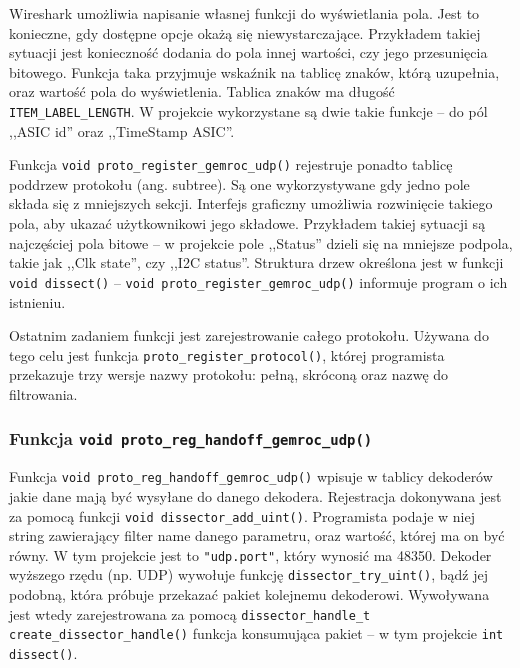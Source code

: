 \documentclass[a4paper, 12pt, twoside, openright]{article}
\begin{document}
	Wireshark umożliwia napisanie własnej funkcji do wyświetlania pola. Jest to konieczne, gdy dostępne opcje okażą się niewystarczające.
	Przykładem takiej sytuacji jest konieczność dodania do pola innej wartości, czy jego przesunięcia bitowego.
	Funkcja taka przyjmuje wskaźnik na tablicę znaków, którą uzupełnia, oraz wartość pola do wyświetlenia. Tablica znaków ma długość
	\texttt{ITEM\_LABEL\_LENGTH}. W projekcie wykorzystane są dwie takie funkcje -- do pól ,,ASIC id'' oraz ,,TimeStamp ASIC''.

	Funkcja \texttt{void proto\_register\_gemroc\_udp()} rejestruje ponadto tablicę poddrzew protokołu (ang. subtree). Są one wykorzystywane
	gdy jedno pole składa się z mniejszych sekcji. Interfejs graficzny umożliwia rozwinięcie takiego pola, aby ukazać użytkownikowi jego składowe.
	Przykładem takiej sytuacji są najczęściej pola bitowe -- w projekcie pole ,,Status'' dzieli się na mniejsze podpola, takie jak
	,,Clk state'', czy ,,I2C status''. Struktura drzew określona jest w funkcji \texttt{void dissect()} --
	\texttt{void proto\_register\_gemroc\_udp()} informuje program o ich istnieniu.

	Ostatnim zadaniem funkcji jest zarejestrowanie całego protokołu. Używana do tego celu jest funkcja \texttt{proto\_register\_protocol()},
	której programista przekazuje trzy wersje nazwy protokołu: pełną, skróconą oraz nazwę do filtrowania.

	\subsubsection{Funkcja \texttt{void proto\_reg\_handoff\_gemroc\_udp()}}
	\indent\par
	Funkcja \texttt{void proto\_reg\_handoff\_gemroc\_udp()} wpisuje w tablicy dekoderów jakie dane mają być wysyłane do danego dekodera.
	Rejestracja dokonywana jest za pomocą funkcji \texttt{void dissector\_add\_uint()}. Programista podaje w niej string zawierający filter name
	danego parametru, oraz wartość, której ma on być równy. W tym projekcie jest to \texttt{"udp.port"}, który wynosić ma 48350.
	Dekoder wyższego rzędu (np. UDP) wywołuje funkcję \texttt{dissector\_try\_uint()}, bądź jej podobną, która próbuje przekazać pakiet
	kolejnemu dekoderowi. Wywoływana jest wtedy zarejestrowana za pomocą \texttt{dissector\_handle\_t create\_dissector\_handle()} funkcja
	konsumująca pakiet -- w tym projekcie \texttt{int dissect()}.
\end{document}
